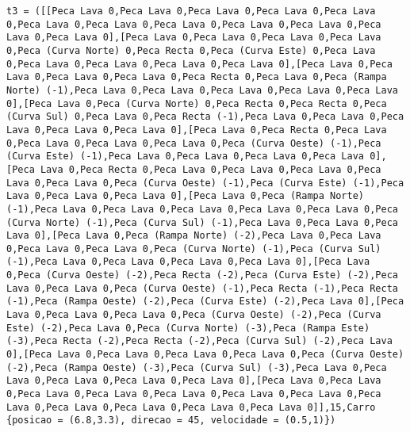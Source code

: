 \documentclass[a4paper]{report}
\begin{document}
\begin{lstlisting}
t3 = ([[Peca Lava 0,Peca Lava 0,Peca Lava 0,Peca Lava 0,Peca Lava 0,Peca Lava 0,Peca Lava 0,Peca Lava 0,Peca Lava 0,Peca Lava 0,Peca Lava 0,Peca Lava 0],[Peca Lava 0,Peca Lava 0,Peca Lava 0,Peca Lava 0,Peca (Curva Norte) 0,Peca Recta 0,Peca (Curva Este) 0,Peca Lava 0,Peca Lava 0,Peca Lava 0,Peca Lava 0,Peca Lava 0],[Peca Lava 0,Peca Lava 0,Peca Lava 0,Peca Lava 0,Peca Recta 0,Peca Lava 0,Peca (Rampa Norte) (-1),Peca Lava 0,Peca Lava 0,Peca Lava 0,Peca Lava 0,Peca Lava 0],[Peca Lava 0,Peca (Curva Norte) 0,Peca Recta 0,Peca Recta 0,Peca (Curva Sul) 0,Peca Lava 0,Peca Recta (-1),Peca Lava 0,Peca Lava 0,Peca Lava 0,Peca Lava 0,Peca Lava 0],[Peca Lava 0,Peca Recta 0,Peca Lava 0,Peca Lava 0,Peca Lava 0,Peca Lava 0,Peca (Curva Oeste) (-1),Peca (Curva Este) (-1),Peca Lava 0,Peca Lava 0,Peca Lava 0,Peca Lava 0],[Peca Lava 0,Peca Recta 0,Peca Lava 0,Peca Lava 0,Peca Lava 0,Peca Lava 0,Peca Lava 0,Peca (Curva Oeste) (-1),Peca (Curva Este) (-1),Peca Lava 0,Peca Lava 0,Peca Lava 0],[Peca Lava 0,Peca (Rampa Norte) (-1),Peca Lava 0,Peca Lava 0,Peca Lava 0,Peca Lava 0,Peca Lava 0,Peca (Curva Norte) (-1),Peca (Curva Sul) (-1),Peca Lava 0,Peca Lava 0,Peca Lava 0],[Peca Lava 0,Peca (Rampa Norte) (-2),Peca Lava 0,Peca Lava 0,Peca Lava 0,Peca Lava 0,Peca (Curva Norte) (-1),Peca (Curva Sul) (-1),Peca Lava 0,Peca Lava 0,Peca Lava 0,Peca Lava 0],[Peca Lava 0,Peca (Curva Oeste) (-2),Peca Recta (-2),Peca (Curva Este) (-2),Peca Lava 0,Peca Lava 0,Peca (Curva Oeste) (-1),Peca Recta (-1),Peca Recta (-1),Peca (Rampa Oeste) (-2),Peca (Curva Este) (-2),Peca Lava 0],[Peca Lava 0,Peca Lava 0,Peca Lava 0,Peca (Curva Oeste) (-2),Peca (Curva Este) (-2),Peca Lava 0,Peca (Curva Norte) (-3),Peca (Rampa Este) (-3),Peca Recta (-2),Peca Recta (-2),Peca (Curva Sul) (-2),Peca Lava 0],[Peca Lava 0,Peca Lava 0,Peca Lava 0,Peca Lava 0,Peca (Curva Oeste) (-2),Peca (Rampa Oeste) (-3),Peca (Curva Sul) (-3),Peca Lava 0,Peca Lava 0,Peca Lava 0,Peca Lava 0,Peca Lava 0],[Peca Lava 0,Peca Lava 0,Peca Lava 0,Peca Lava 0,Peca Lava 0,Peca Lava 0,Peca Lava 0,Peca Lava 0,Peca Lava 0,Peca Lava 0,Peca Lava 0,Peca Lava 0]],15,Carro {posicao = (6.8,3.3), direcao = 45, velocidade = (0.5,1)})


\end{lstlisting}
\end{document}
